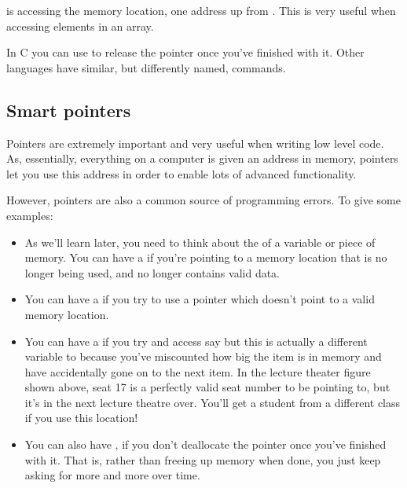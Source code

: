 \documentclass[letterpaper,10pt,british]{sphinxmanual}
\begin{document}
\sphinxAtStartPar
is accessing the memory location, one address up from . This is very useful when accessing elements in an array.

\sphinxAtStartPar
In C you can use  to release the pointer once you’ve finished with it. Other languages have similar, but differently named, commands.


\subsection{Smart pointers}
\label{\detokenize{chapters/programming_fundamentals/pointers:smart-pointers}}\label{\detokenize{chapters/programming_fundamentals/pointers:id1}}
\sphinxAtStartPar
Pointers are extremely important and very useful when writing low level code. As, essentially, everything on a computer is given an address in memory, pointers let you use this address in order to enable lots of advanced functionality.

\sphinxAtStartPar
However, pointers are also a common source of programming errors. To give some examples:
\begin{itemize}
\item {} 
\sphinxAtStartPar
As we’ll learn later, you need to think about the {\hyperref[\detokenize{chapters/programming_fundamentals/lifetimes:lifetimes}]{}} of a variable or piece of memory. You can have a  if you’re pointing to a memory location that is no longer being used, and no longer contains valid data.

\item {} 
\sphinxAtStartPar
You can have a  if you try to use a pointer which doesn’t point to a valid memory location.

\item {} 
\sphinxAtStartPar
You can have a  if you try and access say  but this is actually a different variable to  because you’ve mis\sphinxhyphen{}counted how big the item is in memory and have accidentally gone on to the next item. In the lecture theater figure shown above, seat 17 is a perfectly valid seat number to be pointing to, but it’s in the next lecture theatre over. You’ll get a student from a different class if you use this location!

\item {} 
\sphinxAtStartPar
You can also have , if you don’t deallocate the pointer once you’ve finished with it. That is, rather than freeing up memory when done, you just keep asking for more and more over time.

\end{itemize}
\end{document}
